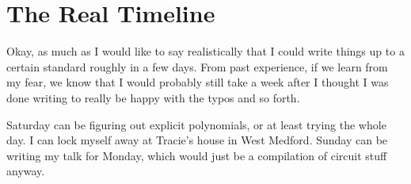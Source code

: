 \documentclass{article}
\begin{document}
\section{The Real Timeline}

Okay, as much as I would like to say realistically that I could write
things up to a certain standard roughly in a few days. From past 
experience, if we learn from my fear, we know that I would probably still
take a week after I thought I was done writing to really be happy with
the typos and so forth.

Saturday can be figuring out explicit polynomials, or at least trying the
whole day. I can lock myself away at Tracie's house in West Medford.
Sunday can be writing my talk for Monday, which would just be a compilation
of circuit stuff anyway.
\end{document}
